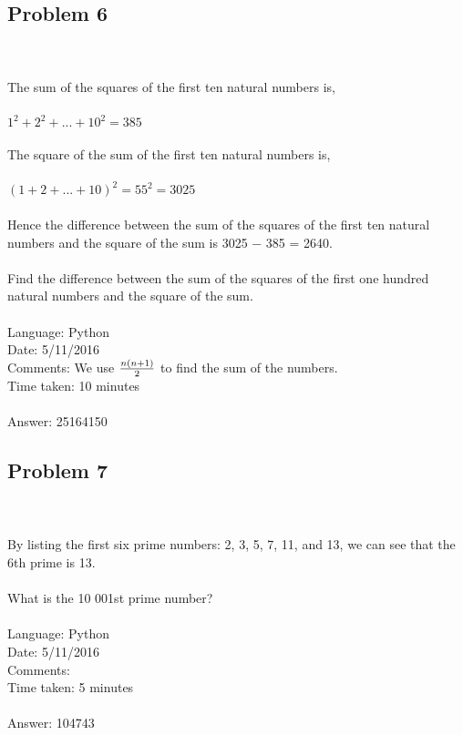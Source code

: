 \documentclass[fleqn]{article}
\begin{document}
\subsection{Problem 6} ~\\
	\\
	The sum of the squares of the first ten natural numbers is,\\ 
	\\
	$1^{2} + 2^{2} + ... + 10^{2} = 385$\\
	\\
	The square of the sum of the first ten natural numbers is,\\
	\\
	$(1 + 2 + ... + 10)^{2} = 55^{2} = 3025$\\
	\\
	Hence the difference between the sum of the squares of the first ten natural numbers and the square of the sum is 3025 − 385 = 2640.\\
	\\
	Find the difference between the sum of the squares of the first one hundred natural numbers and the square of the sum.\\
	\\
	Language: Python\\
	Date: 5/11/2016 \\
	Comments: We use $n(n + 1) \over {2}$ to find the sum of the numbers.\\
	Time taken: 10 minutes\\
	\\
	Answer:  25164150\\
	
\subsection{Problem 7} ~\\
	\\
	By listing the first six prime numbers: 2, 3, 5, 7, 11, and 13, we can see that the 6th prime is 13.\\
	\\
	What is the 10 001st prime number?\\
	\\
	Language: Python\\
	Date: 5/11/2016 \\
	Comments:\\
	Time taken: 5 minutes\\
	\\
	Answer:  104743\\
	
\end{document}
